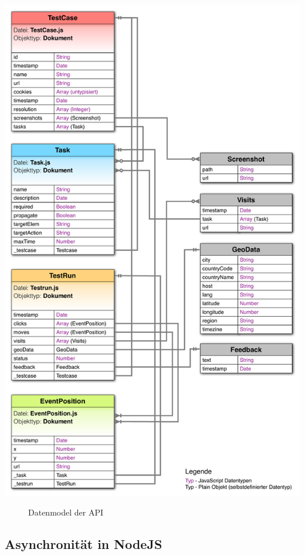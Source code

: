 \begin{center}
\includegraphics[scale=0.45]{./images/models}
\end{center}
\begin{figure}[htb]
   \centering
   \caption{Datenmodel der API}
    \label{models}
\end{figure}

\subsection{Asynchronität in NodeJS}

